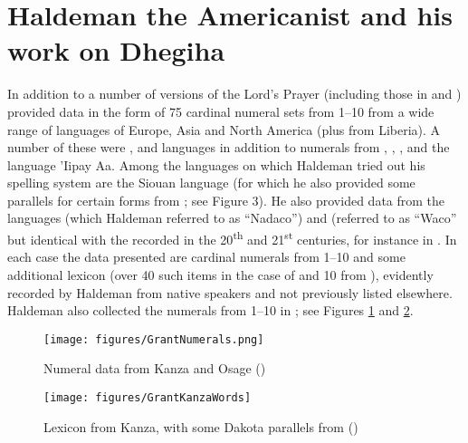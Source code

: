 \documentclass[output=paper]{LSP/langsci}
\begin{document}
\section{Haldeman the Americanist and his work on Dhegiha}  

 \largerpage[-1]
In addition to a number of versions of the Lord's Prayer (including those in  and ) \citet{Haldeman1860}  provided data in the form of 75 cardinal numeral sets from 1--10 from a wide range of languages of Europe, Asia and North America (plus  from Liberia).  A number of these were ,  and  languages in addition to numerals from , , ,  and the  language 'Iipay Aa. Among the languages on which Haldeman tried out his spelling system are the  Siouan language  (for which he also provided some  parallels for certain forms from \citealt{Riggs1852}; see Figure 3).  He also provided data from the  languages  (which Haldeman referred to as ``Nadaco'') and  (referred to as ``Waco'' but identical with the  recorded in the 20\textsuperscript{th} and 21\textsuperscript{st} centuries, for instance in \citet{Rood1975}. In each case the data presented are cardinal numerals from 1--10 and some additional lexicon (over 40 such items in the case of  and 10 from ), evidently recorded by Haldeman from native speakers and not previously listed elsewhere. Haldeman also collected the numerals from 1--10 in ; see Figures \ref{haldemannumerals} and \ref{haldemanlexicon}.   

\begin{figure}
\centering
\caption{Numeral data from {Kanza} and {Osage} (\citealt[146, \S711, 712]{Haldeman1860})} \label{haldemannumerals}
\texttt{[image: figures/GrantNumerals.png]}
\end{figure}

\begin{figure}
\centering
 
\caption{Lexicon from {Kanza}, with some {Dakota} parallels from \citet{Riggs1852}  (\citealt[135, \S634]{Haldeman1860})} \label{haldemanlexicon}
\texttt{[image: figures/GrantKanzaWords]}
\end{figure}
\end{document}
